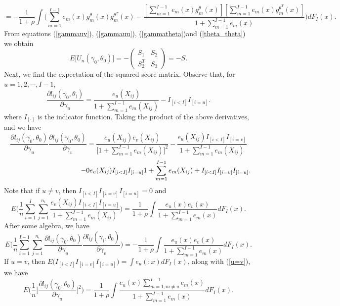 \documentclass[11pt]{article}
\theoremstyle{plain}
\theoremstyle{definition}
\theoremstyle{remark}
\theoremstyle{definition}
\begin{document}
\begin{equation}
=-\frac{1}{1+\rho}\int\Bigg(\sum_{m=1}^{I-1}e_m(x)g_m^\theta(x)g_m^{\theta^T}(x)
-\frac{[\sum_{m=1}^{I-1}e_m(x) g_m^\theta(x)]
[\sum_{m=1}^{I-1}e_m(x)g_m^{\theta^T}(x)]} {1+ \sum_{m=1}^{I-1
}e_m(x)}\Bigg)dF_I(x).\label{theta_theta}
\end{equation}
From equations (\ref{gammauv}), (\ref{gammauu}), (\ref{gammatheta})and (\ref{theta_theta}) we obtain
\begin{equation}
E\Big[U_n(\gamma_0,\theta_0) \Big]=- \left(\begin{array}{cc} S_1 &
S_2 \\ S_2^T & S_3
\end{array} \right)=- S.\label{fisherinfo}
\end{equation}
Next, we find the expectation of the squared score matrix. Observe that, for $u=1, 2, \cdots, I-1$,
$$\frac{\partial l_{ij}(\gamma_0,\theta_))}{\partial\gamma_u}
=\frac{e_u( X_{ij})}
{1+\sum_{m=1}^{I-1}e_m( X_{ij})}
-I_{[i<I]}I_{[i=u]}.$$
where $I_{[\cdot]}$ is the indicator function. Taking the product of the above derivatives, and we have
$$\frac{\partial l_{ij}(\gamma_0,\theta_0)}{\partial\gamma_u}
\frac{\partial l_{ij}(\gamma_0, \theta_0)}{\partial
\gamma_v}=\frac{e_u(X_{ij})e_v(X_{ij})}{\Big[1+\sum_{m=1}^{I-1}e_m(X_{ij})\Big]^2}-\frac{e_u(
X_{ij})I_{[i<I]}I_{[i=v]}}{1+\sum_{m=1}^{I-1}e_m(X_{ij})}$$
$$\hspace{1.5in}-\frac{e_v(X_{ij})I_{[i<I]}I_{[i=u]}}{1+\sum_{m=1}^{I-1}e_m(X_{ij})}+I_{[i<I]}I_{[i=v]}I_{[i=u]}.$$
\noindent Note that if $u \ne v$, then $I_{[i<I]}I_{[i=v]}I_{[i=u]}=0$ and
\begin{equation}
E\Big(
\frac{1}{n}\sum_{i=1}^I\sum_{j=1}^{n_i}\frac{e_v(X_{ij})I_{[i<I]}I_{[i=u]}}{1+\sum_{m=1}^{I-1}e_m(
X_{ij})}\Big) =\frac{1}{1+\rho}\int \frac{e_u(x)e_v(x)}{1+\sum_{m=1}^{I-1}e_m(x)}dF_I(x).
\label{u=v}
\end{equation}
After some algebra, we have
\begin{equation}
E\Big(\frac{1}{n} \sum_{i=1}^{I-1}\sum_{j=1}^{n_i}\frac{\partial
l_{ij}(\gamma_0,\theta_0)}{\partial\gamma_u} \frac{\partial
l_{ij}(\gamma_), \theta_0)}{\partial
\gamma_v}\Big)=-\frac{1}{1+\rho}\int \frac{e_u(x)e_v(x)}{1+\sum_{m=1}^{I-1}e_m(x)}dF_I(x).
\label{a11}
\end{equation}
\noindent If $u=v$, then $E\big(I_{[i<I]}I_{[i=v]}I_{[i=u]}\big)=\int e_u(:x)dF_I(x)$, along with (\ref{u=v}), we have
\begin{equation}
E\big(\frac{1}{n}\Big[\frac{\partial l_{ij}(\gamma_0,\theta_0)}{\partial \gamma_u}
\Big]^2\big) = \frac{1}{1+\rho}\int \frac{e_u(x)\sum_{m=1,m\ne u }^{I-1}e_m(x)}
{1+\sum_{m=1}^{I-1}e_m(x)}dF_I(x). \label{a110}
\end{equation}
\end{document}
